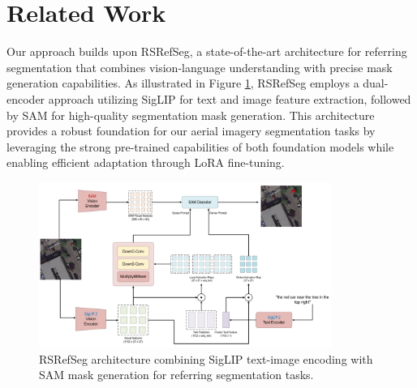 
\section{Related Work}
\label{sec:related}

Our approach builds upon RSRefSeg, a state-of-the-art architecture for referring segmentation that combines vision-language understanding with precise mask generation capabilities. As illustrated in Figure \ref{fig:rsrefseg_architecture}, RSRefSeg employs a dual-encoder approach utilizing SigLIP for text and image feature extraction, followed by SAM for high-quality segmentation mask generation. This architecture provides a robust foundation for our aerial imagery segmentation tasks by leveraging the strong pre-trained capabilities of both foundation models while enabling efficient adaptation through LoRA fine-tuning.

\begin{figure}[t]
\centering
\includegraphics[width=0.85\textwidth]{./images/rsrefseg.png}
\caption{RSRefSeg architecture combining SigLIP text-image encoding with SAM mask generation for referring segmentation tasks.}
\label{fig:rsrefseg_architecture}
\end{figure}


